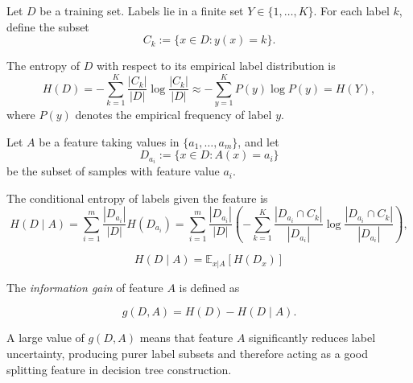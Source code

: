 \documentclass[../main]{subfiles}
\begin{document}
        Let $D$ be a training set.  
        Labels lie in a finite set $Y\in\{1,\ldots,K\}$.  
        For each label $k$, define the subset
        \begin{equation}
            C_k := \{x\in D : y(x)=k\}.
        \end{equation}
        
        The entropy of $D$ with respect to its empirical label distribution is
        \begin{equation}
            H(D)
            = -\sum_{k=1}^K 
                \frac{|C_k|}{|D|}
                \log\frac{|C_k|}{|D|}
            \approx
            -\sum_{y=1}^K P(y)\log P(y)
            = H(Y),
        \end{equation}
        where $P(y)$ denotes the empirical frequency of label $y$.
        
        Let $A$ be a feature taking values in $\{a_1,\ldots,a_m\}$, and let
        \begin{equation}
            D_{a_i} := \{x\in D : A(x)=a_i\}
        \end{equation}
        be the subset of samples with feature value $a_i$.
        
        The conditional entropy of labels given the feature is
        \begin{equation}
            H(D\mid A)
            =
            \sum_{i=1}^m 
                \frac{|D_{a_i}|}{|D|}
                H(D_{a_i})
            =
            \sum_{i=1}^m 
                \frac{|D_{a_i}|}{|D|}
                \left(
                    -\sum_{k=1}^K 
                    \frac{|D_{a_i}\cap C_k|}{|D_{a_i}|}
                    \log \frac{|D_{a_i}\cap C_k|}{|D_{a_i}|}
                \right),
        \end{equation}
\begin{note}
    \begin{equation}
        H(D\mid A)=\mathbb E_{x|A}[H(D_x)]
    \end{equation}
\end{note}
        The \emph{information gain} of feature $A$ is defined as
        \begin{definition}
            \begin{equation}
                g(D,A)
               =
                H(D) - H(D\mid A).
            \end{equation}
        \end{definition}
        
        A large value of $g(D,A)$ means that feature $A$ significantly reduces label
        uncertainty, producing purer label subsets and therefore acting as a good
        splitting feature in decision tree construction.
\end{document}
